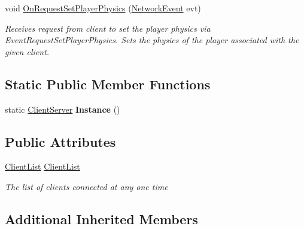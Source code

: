 \begin{DoxyCompactItemize}
void \hyperlink{class_skyrates_1_1_server_1_1_network_1_1_client_server_ab12fc7b88d98e13c6ea6bd00badde39f}{On\-Request\-Set\-Player\-Physics} (\hyperlink{class_skyrates_1_1_common_1_1_network_1_1_event_1_1_network_event}{Network\-Event} evt)
\begin{DoxyCompactList}\small\item\em Receives request from client to set the player physics via Event\-Request\-Set\-Player\-Physics. Sets the physics of the player associated with the given client. \end{DoxyCompactList}\end{DoxyCompactItemize}
\subsection*{Static Public Member Functions}
\begin{DoxyCompactItemize}
\item 
\hypertarget{class_skyrates_1_1_server_1_1_network_1_1_client_server_a2fd0b559183f128fbeabf0dfd9fe172f}{static \hyperlink{class_skyrates_1_1_server_1_1_network_1_1_client_server}{Client\-Server} {\bfseries Instance} ()}\label{class_skyrates_1_1_server_1_1_network_1_1_client_server_a2fd0b559183f128fbeabf0dfd9fe172f}

\end{DoxyCompactItemize}
\subsection*{Public Attributes}
\begin{DoxyCompactItemize}
\item 
\hyperlink{class_skyrates_1_1_server_1_1_network_1_1_client_list}{Client\-List} \hyperlink{class_skyrates_1_1_server_1_1_network_1_1_client_server_a285b4a86c3dda33cf70d8dad87a11ce3}{Client\-List}
\begin{DoxyCompactList}\small\item\em The list of clients connected at any one time \end{DoxyCompactList}\end{DoxyCompactItemize}
\subsection*{Additional Inherited Members}


